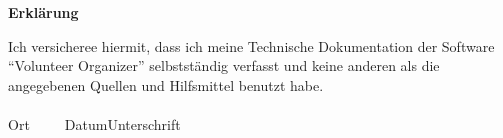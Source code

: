 

\newpage
\thispagestyle{empty}
\begin{framed}
  \begin{center}
    \Large\bfseries Erklärung
  \end{center}
  \medskip
  \noindent
  Ich versicheree hiermit, dass ich meine Technische Dokumentation der Software \enquote{Volunteer Organizer}
  selbstständig verfasst und keine anderen als die angegebenen Quellen und Hilfsmittel benutzt habe. %
  \vspace{3cm}\\
  \noindent
  \underline{\hspace{4cm}}\hfill\underline{\hspace{6cm}}\\
  Ort~~~~~Datum\hfill Unterschrift\hspace{4cm}
\end{framed}


\endinput
